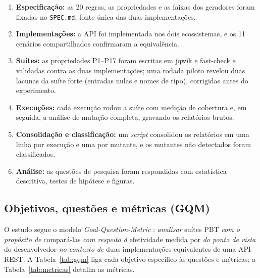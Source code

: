 \begin{enumerate}[itemsep=0pt, topsep=2pt]
  \item \textbf{Especificação:} as 20 regras, as propriedades e as faixas dos geradores foram fixadas no \texttt{SPEC.md}, fonte única das duas implementações.
  \item \textbf{Implementações:} a API foi implementada nos dois ecossistemas, e os 11 cenários compartilhados confirmaram a equivalência.
  \item \textbf{Suítes:} as propriedades P1--P17 foram escritas em jqwik e fast-check e validadas contra as duas implementações; uma rodada piloto revelou duas lacunas da suíte forte (entradas nulas e nomes de tipo), corrigidas antes do experimento.
  \item \textbf{Execuções:} cada execução rodou a suíte com medição de cobertura e, em seguida, a análise de mutação completa, gravando os relatórios brutos.
  \item \textbf{Consolidação e classificação:} um \textit{script} consolidou os relatórios em uma linha por execução e uma por mutante, e os mutantes não detectados foram classificados.
  \item \textbf{Análise:} as questões de pesquisa foram respondidas com estatística descritiva, testes de hipótese e figuras.
\end{enumerate}

\subsection{Objetivos, questões e métricas (GQM)}
\label{sec:gqm}

O estudo segue o modelo \textit{Goal-Question-Metric} \citep{basili1994gqm}: \textit{analisar} suítes PBT \textit{com o propósito de} compará-las \textit{com respeito à} efetividade medida por \ms{} \textit{do ponto de vista} do desenvolvedor \textit{no contexto de} duas implementações equivalentes de uma API REST. A Tabela~\ref{tab:gqm} liga cada objetivo específico às questões e métricas; a Tabela~\ref{tab:metricas} detalha as métricas.


